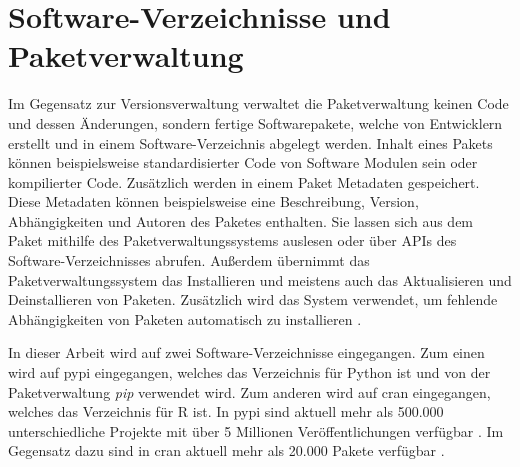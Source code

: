 \section{Software-Verzeichnisse und Paketverwaltung}
\label{sec:paketverwaltung}
Im Gegensatz zur Versionsverwaltung verwaltet die Paketverwaltung keinen Code und dessen Änderungen, sondern fertige Softwarepakete, welche von Entwicklern erstellt und in einem Software-Verzeichnis abgelegt werden.
Inhalt eines Pakets können beispielsweise standardisierter Code von Software Modulen sein oder kompilierter Code.
Zusätzlich werden in einem Paket Metadaten gespeichert.
Diese Metadaten können beispielsweise eine Beschreibung, Version, Abhängigkeiten und Autoren des Paketes enthalten.
Sie lassen sich aus dem Paket mithilfe des Paketverwaltungssystems auslesen oder über APIs des Software-Verzeichnisses abrufen.
Außerdem übernimmt das Paketverwaltungssystem das Installieren und meistens auch das Aktualisieren und Deinstallieren von Paketen.
Zusätzlich wird das System verwendet, um fehlende Abhängigkeiten von Paketen automatisch zu installieren \autocite{spinellis_package_2012}.

In dieser Arbeit wird auf zwei Software-Verzeichnisse eingegangen.
Zum einen wird auf \gls{pypi} eingegangen, welches das Verzeichnis für Python ist und von der Paketverwaltung \emph{pip} verwendet wird.
Zum anderen wird auf \gls{cran} eingegangen, welches das Verzeichnis für R ist.
In \gls{pypi} sind aktuell mehr als 500.000 unterschiedliche Projekte mit über 5 Millionen Veröffentlichungen verfügbar \autocite{python_software_foundation_pypi_2024}.
Im Gegensatz dazu sind in \gls{cran} aktuell mehr als 20.000 Pakete verfügbar \autocite{cran_team_comprehensive_2024}.

